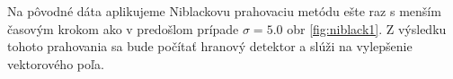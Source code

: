 \documentclass[a4paper,11pt,oneside]{article}%
\begin{document}
Na pôvodné dáta aplikujeme Niblackovu prahovaciu metódu ešte raz s menším časovým krokom ako v predošlom prípade  $\sigma = 5.0$ obr \ref{fig:niblack1}. Z výsledku tohoto prahovania sa bude počítať hranový detektor a slúži na vylepšenie vektorového poľa.

 \begin{figure}[H]  
    \hspace{5px}

\end{figure}
\end{document}
